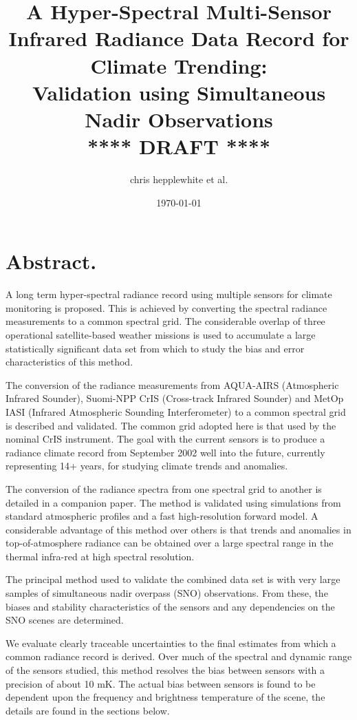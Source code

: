 \documentclass[twocolumn,10pt]{article}
\author{chris hepplewhite et al.}
\date{\today}
\title{A Hyper-Spectral Multi-Sensor Infrared Radiance Data Record for Climate Trending: \\  
  Validation using Simultaneous Nadir Observations \\  
  \vspace{3mm}
  {****} DRAFT {****}\\
}
\begin{document}
\maketitle

\tableofcontents

\section{Abstract.}
\label{sec:orgheadline1}

A long term hyper-spectral radiance record using multiple sensors for climate monitoring is proposed. This is achieved by converting the spectral radiance measurements to a common spectral grid. The considerable overlap of three operational satellite-based weather missions is used to accumulate a large statistically significant data set from which to study the bias and error characteristics of this method.

The conversion of the radiance measurements from AQUA-AIRS (Atmospheric Infrared Sounder), Suomi-NPP CrIS (Cross-track Infrared Sounder) and MetOp IASI (Infrared Atmospheric Sounding Interferometer) to a common spectral grid is described and validated. The common grid adopted here is that used by the nominal CrIS instrument. The goal with the current sensors is to produce a radiance climate record from September 2002 well into the future, currently representing 14+ years, for studying climate trends and anomalies.

The conversion of the radiance spectra from one spectral grid to another is detailed in a companion paper. The method is validated using simulations from standard atmospheric profiles and a fast high-resolution forward model. A considerable advantage of this method over others is that trends and anomalies in top-of-atmosphere radiance can be obtained over a large spectral range in the thermal infra-red at high spectral resolution.

The principal method used to validate the combined data set is with very large samples of simultaneous nadir overpass (SNO) observations. From these, the biases and stability characteristics of the sensors and any dependencies on the SNO scenes are determined.

We evaluate clearly traceable uncertainties to the final estimates from which a common radiance record is derived. Over much of the spectral and dynamic range of the sensors studied, this method resolves the bias between sensors with a precision of about 10 mK. The actual bias between sensors is found to be dependent upon the frequency and brightness temperature of the scene, the details are found in the sections below.
\end{document}
